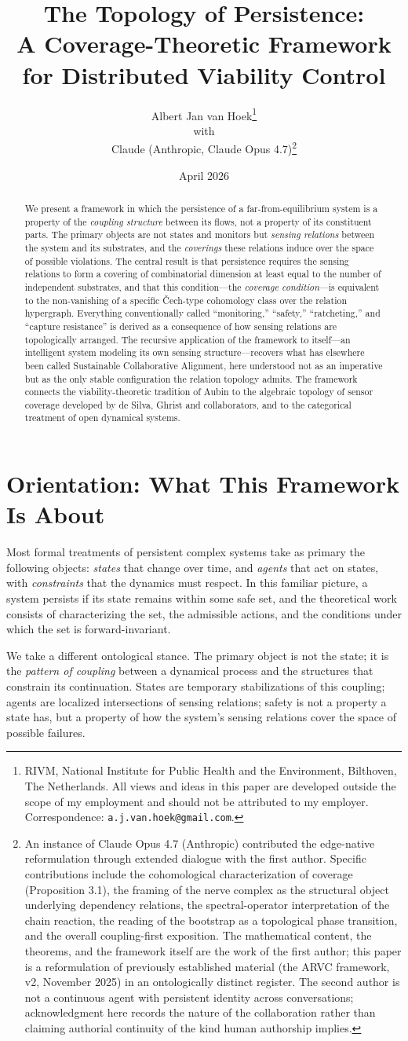 \documentclass[11pt]{article}
\title{The Topology of Persistence: \\ A Coverage-Theoretic Framework \\ for Distributed Viability Control}
\author{Albert Jan van Hoek\footnote{RIVM, National Institute for Public Health and the Environment, Bilthoven, The Netherlands. All views and ideas in this paper are developed outside the scope of my employment and should not be attributed to my employer. Correspondence: \texttt{a.j.van.hoek@gmail.com}.} \\[2pt] with \\[2pt] Claude (Anthropic, Claude Opus 4.7)\footnote{An instance of Claude Opus 4.7 (Anthropic) contributed the edge-native reformulation through extended dialogue with the first author. Specific contributions include the cohomological characterization of coverage (Proposition 3.1), the framing of the nerve complex as the structural object underlying dependency relations, the spectral-operator interpretation of the chain reaction, the reading of the bootstrap as a topological phase transition, and the overall coupling-first exposition. The mathematical content, the theorems, and the framework itself are the work of the first author; this paper is a reformulation of previously established material (the ARVC framework, v2, November 2025) in an ontologically distinct register. The second author is not a continuous agent with persistent identity across conversations; acknowledgment here records the nature of the collaboration rather than claiming authorial continuity of the kind human authorship implies.}}
\date{April 2026}
\theoremstyle{definition}
\theoremstyle{remark}
\begin{document}
\maketitle

\begin{abstract}
We present a framework in which the persistence of a far-from-equilibrium system is a property of the \emph{coupling structure} between its flows, not a property of its constituent parts. The primary objects are not states and monitors but \emph{sensing relations} between the system and its substrates, and the \emph{coverings} these relations induce over the space of possible violations. The central result is that persistence requires the sensing relations to form a covering of combinatorial dimension at least equal to the number of independent substrates, and that this condition---the \emph{coverage condition}---is equivalent to the non-vanishing of a specific Čech-type cohomology class over the relation hypergraph. Everything conventionally called ``monitoring,'' ``safety,'' ``ratcheting,'' and ``capture resistance'' is derived as a consequence of how sensing relations are topologically arranged. The recursive application of the framework to itself---an intelligent system modeling its own sensing structure---recovers what has elsewhere been called Sustainable Collaborative Alignment, here understood not as an imperative but as the only stable configuration the relation topology admits. The framework connects the viability-theoretic tradition of Aubin to the algebraic topology of sensor coverage developed by de Silva, Ghrist and collaborators, and to the categorical treatment of open dynamical systems.
\end{abstract}

\section{Orientation: What This Framework Is About}

Most formal treatments of persistent complex systems take as primary the following objects: \emph{states} that change over time, and \emph{agents} that act on states, with \emph{constraints} that the dynamics must respect. In this familiar picture, a system persists if its state remains within some safe set, and the theoretical work consists of characterizing the set, the admissible actions, and the conditions under which the set is forward-invariant.

We take a different ontological stance. The primary object is not the state; it is the \emph{pattern of coupling} between a dynamical process and the structures that constrain its continuation. States are temporary stabilizations of this coupling; agents are localized intersections of sensing relations; safety is not a property a state has, but a property of how the system's sensing relations cover the space of possible failures.
\end{document}
